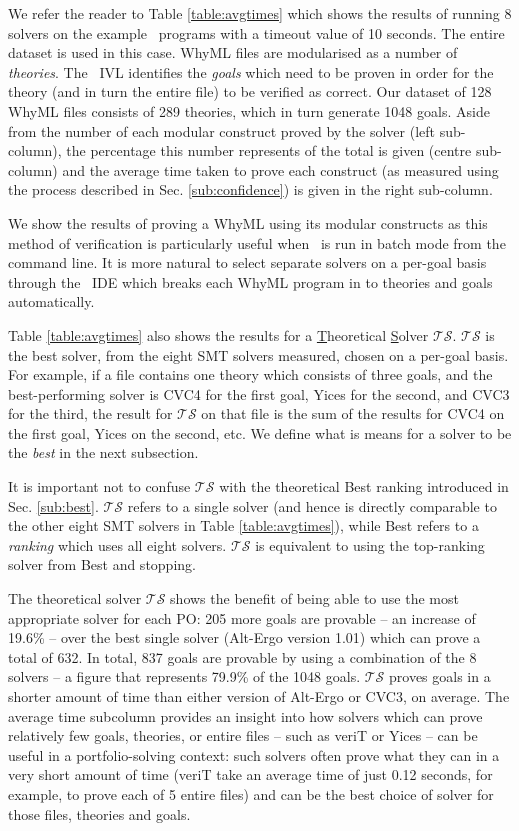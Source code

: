 We refer the reader to Table \ref{table:avgtimes} which shows the results of running 8 solvers on the example \why~programs with a timeout value of 10 seconds. 
The entire dataset is used in this case. 
WhyML files are modularised as a number of \textit{theories}. The \why~IVL identifies the \textit{goals} which need to be proven in order for the theory (and in turn the entire file) to be verified as correct. 
Our dataset of 128 WhyML files consists of 289 theories, which in turn generate 1048 goals. 
Aside from the number of each modular construct proved by the solver (left sub-column), the percentage this number represents of the total is given (centre sub-column) and the average time taken to prove each construct (as measured using the process described in Sec. \ref{sub:confidence}) is given in the right sub-column. 

We show the results of proving a WhyML using its modular constructs as this method of verification is particularly useful when \why~is run in batch mode from the command line.
It is more natural to select separate solvers on a per-goal basis through the \why~IDE which breaks each WhyML program in to theories and goals automatically. 

Table \ref{table:avgtimes} also shows the results for a \underline{T}heoretical \underline{S}olver $ \mathcal{TS} $. 
$ \mathcal{TS} $ is the best solver, from the eight SMT solvers measured, chosen on a per-goal basis. 
For example, if a file contains one theory which consists of three goals, and the best-performing solver is CVC4 for the first goal, Yices for the second, and CVC3 for the third, the result for $\mathcal{TS}$ on that file is the sum of the results for CVC4 on the first goal, Yices on the second, etc.
We define what is means for a solver to be the \textit{best} in the next subsection.

It is important not to confuse $\mathcal{TS}$ with the theoretical \textsf{Best} ranking introduced in Sec. \ref{sub:best}. 
$\mathcal{TS}$ refers to a single solver (and hence is directly comparable to the other eight SMT solvers in Table \ref{table:avgtimes}), while \textsf{Best} refers to a \textit{ranking} which uses all eight solvers. $\mathcal{TS}$ is equivalent to using the top-ranking solver from \textsf{Best} and stopping.

The theoretical solver $\mathcal{TS}$ shows the benefit of being able to use the most appropriate solver for each PO: 205 more goals are provable -- an increase of 19.6\% -- over the best single solver (Alt-Ergo version 1.01) which can prove a total of 632. 
In total, 837 goals are provable by using a combination of the 8 solvers -- a figure that represents 79.9\% of the 1048 goals. 
$\mathcal{TS}$ proves goals in a shorter amount of time than either version of Alt-Ergo or CVC3, on average. 
The average time subcolumn provides an insight into how solvers which can prove relatively few goals, theories, or entire files -- such as veriT or Yices -- can be useful in a portfolio-solving context: such solvers often prove what they can in a very short amount of time (veriT take an average time of just 0.12 seconds, for example, to prove each of 5 entire files) and can be the best choice of solver for those files, theories and goals. 

